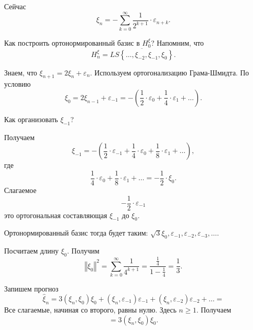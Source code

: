 Сейчас
\begin{equation*}
  \xi_n =
  -\sum \limits_{k = 0}^{ \infty } \frac{1}{2^{k + 1}} \cdot \varepsilon_{n + k}.
\end{equation*}

Как построить ортонормированный базис в $H_0^{ \xi }$?
Напомним, что
\begin{equation*}
  H_n^{ \xi } =
  \overline{LS \left\{ \dotsc, \xi_{-2}, \xi_{-1}, \xi_0 \right\} }.
\end{equation*}

Знаем, что $ \xi_{n + 1} = 2 \xi_n + \varepsilon_n$.
Используем ортогонализацию Грама-Шмидта.
По условию
\begin{equation*}
  \xi_0 =
  2 \xi_{n - 1} + \varepsilon_{-1} =
  -\left( \frac{1}{2} \cdot \varepsilon_0 + \frac{1}{4} \cdot \varepsilon_1 + \dotsc \right).
\end{equation*}

Как организовать $ \xi_{-1}$?

Получаем
\begin{equation*}
  \xi_{-1} =
  -\left(
    \frac{1}{2} \cdot \varepsilon_{-1} + \frac{1}{4} \cdot \varepsilon_0 +
    \frac{1}{8} \cdot \varepsilon_1 + \dotsc
  \right),
\end{equation*}
где
\begin{equation*}
  \frac{1}{4} \cdot \varepsilon_0 + \frac{1}{8} \cdot \varepsilon_1 + \dotsc =
  -\frac{1}{2} \cdot \xi_0.
\end{equation*}
Слагаемое
\begin{equation*}
  -\frac{1}{2} \cdot \varepsilon_{-1}
\end{equation*}
это ортогональная составляющая $ \xi_{-1}$ до $ \xi_0$.

Ортонормированный базис тогда будет таким:
$ \sqrt{3} \xi_0, \varepsilon_{-1}, \varepsilon_{-2}, \varepsilon_{-3}, \dotsc $.

Посчитаем длину $ \xi_0$.
Получим
\begin{equation*}
  \left \Vert \xi_0 \right \Vert^2 =
  \sum \limits_{k = 0}^{ \infty } \frac{1}{4^{k + 1}} =
  \frac{ \frac{1}{4}}{1 - \frac{1}{4}} =
  \frac{1}{3}.
\end{equation*}

Запишем прогноз
\begin{equation*}
  \hat{ \xi }_n =
  3 \left( \xi_n, \xi_0 \right) \xi_0 + \left( \xi_n, \varepsilon_{-1} \right) \varepsilon_{-1} +
  \left( \xi_n, \varepsilon_{-2} \right) \varepsilon_{-2} + \dotsc =
\end{equation*}
Все слагаемые, начиная со второго, равны нулю.
Здесь $n \geq 1$.
Получаем
\begin{equation*}
  = 3 \left( \xi_n, \xi_0 \right) \xi_0.
\end{equation*}

